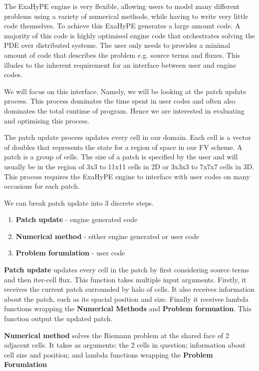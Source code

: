 The ExaHyPE engine is very flexible, allowing users to model many different problems using a variety of numerical methods, while having to write very little code themselves.
To achieve this ExaHyPE generates a large amount code.
A majority of this code is highly optimised engine code that orchestrates solving the PDE over distributed systems.
The user only needs to provides a minimal amount of code that describes the problem e.g. source terms and fluxes.
This illudes to the inherent requirement for an interface between user and engine codes.

We will focus on this interface.
Namely, we will be looking at the patch update process.
This process dominates the time spent in user codes and often also dominates the total runtime of program.
Hence we are interested in evaluating and optimising this process.

The patch update process updates every cell in our domain.
Each cell is a vector of doubles that represents the state for a region of space in our FV scheme. 
A patch is a group of cells.
The size of a patch is specified by the user and will usually be in the region of 3x3 to 11x11 cells in 2D or 3x3x3 to 7x7x7 cells in 3D. %
This process requires the ExaHyPE engine to interface with user codes on many occasions for each patch.
 
\newcommand{\func}[1]{\textbf{#1}}
\newcommand{\var}[1]{\textbf{#1}}

We can break patch update into 3 discrete steps.
\begin{enumerate}
    \item \func{Patch update} - engine generated code
    \item  \func{Numerical method} - either engine generated or user code
    \item \func{Problem forumlation} - user code
\end{enumerate}

\func{Patch update} updates every cell in the patch by first considering source terms and then iter-cell flux.
This function takes multiple input arguments.
Firstly, it receives the current patch surrounded by halo of cells.
It also receives information about the patch, such as its spacial position and size.
Finally it receives lambda functions wrapping the \func{Numerical Methods} and \func{Problem formuation}. 
This function output the updated patch.  

\func{Numerical method} solves the Riemann problem at the shared face of 2 adjacent cells.
It takes as arguments: the 2 cells in question; information about cell size and position; and lambda functions wrapping the \func{Problem Forumlation}

